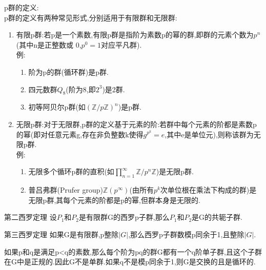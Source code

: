 \documentclass[oneside,openany]{ctexbook}
\begin{document}
p群的定义:\\
p群的定义有两种常见形式,分别适用于有限群和无限群:
\begin{enumerate}
  \item 有限p群:若p是一个素数,有限p群是指阶为素数p的幂的群,即群的元素个数为$p^n$(其中n是正整数或 0,$p^0 = 1$对应平凡群).\\
  例:
  \begin{enumerate}
    \item 阶为p的群(循环群)是p群.
    \item 四元数群$Q_8$(阶为8,即$2^3$)是2群.
    \item 初等阿贝尔p群(如$(\mathbb{Z}/p\mathbb{Z})^n$)是p群.
  \end{enumerate}
  \item 无限p群:对于无限群,p群的定义基于元素的阶:若群中每个元素的阶都是素数p的幂(即对任意元素g,存在非负整数k使得$g^{p^k}=e$,其中e是单位元),则称该群为无限p群.\\
  例:
    \begin{enumerate}
    \item 无限多个循环p群的直积(如$\prod_{n=1}^{\infty} \mathbb{Z}/p^n\mathbb{Z}$)是无限p群.
    \item 普吕弗群(Prufer group)$\mathbb{Z}(p^\infty)$(由所有$p^k$次单位根在乘法下构成的群)是无限p群,其每个元素的阶都是p的幂,但群本身是无限的.
  \end{enumerate}
\end{enumerate}

\begin{definition}{第二西罗定理}{}
设$P_1$和$P_2$是有限群G的西罗p子群,那么$P_1$和$P_2$是G的共轭子群.
\end{definition}

\begin{definition}{第三西罗定理}{}
如果G是有限群,p整除$|G|$,那么西罗p子群数模p同余于1,且整除$|G|$.
\end{definition}

\begin{definition}{}{}
如果p和q是满足p<q的素数,那么每个阶为pq的群G都有一个q阶单子群,且这个子群在G中是正规的.因此G不是单群.如果q不是模p同余于1,则G是交换的且是循环的.
\end{definition}
\end{document}
